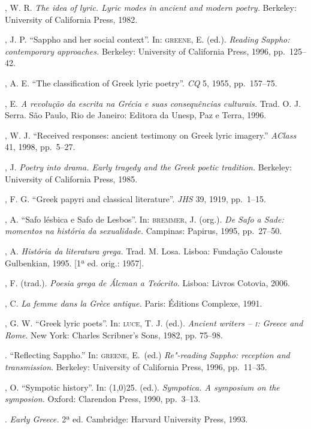 \begin{bibliohedra}
, W. R. \textit{The idea of lyric. Lyric modes in ancient and
modern poetry.} Berkeley: University of California Press, 1982.

, J. P. “Sappho and her social context”. In: \textsc{greene}, E.
(ed.). \textit{Reading Sappho: contemporary approaches.} Berkeley: University
of California Press, 1996, pp.~125--42.

, A. E. “The classification of Greek lyric poetry”. \textit{CQ}
5, 1955, pp.~157--75.

, E. \textit{A revolução da escrita na Grécia e suas
consequências culturais.} Trad. O. J. Serra. São Paulo, Rio de Janeiro: Editora
da Unesp, Paz e Terra, 1996.

, W. J. ``Received responses: ancient testimony on Greek lyric imagery.'' 
\textit{AClass} 41, 1998, pp.~5--27. 

, J. \textit{Poetry into drama. Early tragedy and the Greek
poetic tradition.} Berkeley: University of California Press, 1985.

, F. G. “Greek papyri and classical literature”.
\textit{JHS} 39, 1919, pp.~1--15.

, A. “Safo lésbica e Safo de Lesbos”. In: \textsc{bremmer}, J.
(org.). \textit{De Safo a Sade: momentos na história da sexualidade.} Campinas:
Papirus, 1995, pp.~27--50.

, A. \textit{História da literatura grega.} Trad. M. Losa. Lisboa:
Fundação Calouste Gulbenkian, 1995. [1ª ed. orig.: 1957].

, F. (trad.). \textit{Poesia grega de Álcman a Teócrito.}
Lisboa: Livros Cotovia, 2006.

, C. \textit{La femme dans la Grèce antique.} Paris: Éditions
Complexe, 1991.

, G. W. “Greek lyric poets”. In: \textsc{luce}, T. J. (ed.). \textit{Ancient writers -- \textsc{i}: Greece and Rome}. New York: Charles Scribner's Sons, 1982, pp. 75--98. 

\titidem. ``Reflecting Sappho.'' In: \textsc{greene}, E.~(ed.) 
\textit{Re"-reading Sappho: reception and transmission}. Berkeley: University of California Press,
1996, pp.~11--35.

, O. “Sympotic history”. In: \line(1,0){25}. (ed.).
\textit{Sympotica. A symposium on the symposion.} Oxford: Clarendon Press,
1990, pp.~3--13.

\titidem. \textit{Early Greece.} 2ª ed.
Cambridge: Harvard University Press, 1993.


\end{bibliohedra}

